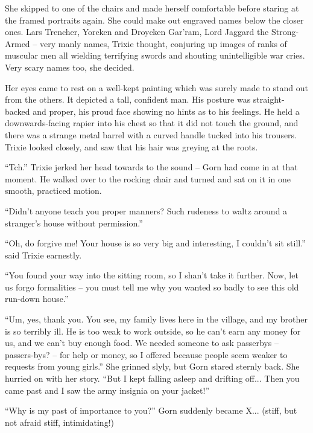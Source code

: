 She skipped to one of the chairs and made herself comfortable before staring at
the framed portraits again. She could make out engraved names below the closer
ones. Lars Trencher, Yorcken and Droycken Gar'ram, Lord Jaggard the Strong-Armed
-- very manly names, Trixie thought, conjuring up images of ranks of muscular
men all wielding terrifying swords and shouting unintelligible war cries. Very
scary names too, she decided.

Her eyes came to rest on a well-kept painting which was surely made to stand out
from the others. It depicted a tall, confident man. His posture was
straight-backed and proper, his proud face showing no hints as to his feelings.
He held a downwards-facing rapier into his chest so that it did not touch the
ground, and there was a strange metal barrel with a curved handle tucked into
his trousers. Trixie looked closely, and saw that his hair was greying at the
roots.

``Tch.'' Trixie jerked her head towards to the sound -- Gorn had come in at that
moment. He walked over to the rocking chair and turned and sat on it in one
smooth, practiced motion.

``Didn't anyone teach you proper manners? Such rudeness to waltz around a
stranger's house without permission.''

``Oh, do forgive me! Your house is so very big and interesting, I couldn't sit
still.'' said Trixie earnestly.

``You found your way into the sitting room, so I shan't take it further. Now,
let us forgo formalities -- you must tell me why you wanted so badly to see this
old run-down house.''

``Um, yes, thank you. You see, my family lives here in the village, and my
brother is so terribly ill. He is too weak to work outside, so he can't earn any
money for us, and we can't buy enough food. We needed someone to ask passerbys
-- passers-bys?  -- for help or money, so I offered because people seem weaker
to requests from young girls.'' She grinned slyly, but Gorn stared sternly back.
She hurried on with her story. ``But I kept falling asleep and drifting off...
Then you came past and I saw the army insignia on your jacket!''

``Why is my past of importance to you?'' Gorn suddenly became X... (stiff, but
not afraid stiff, intimidating!)
